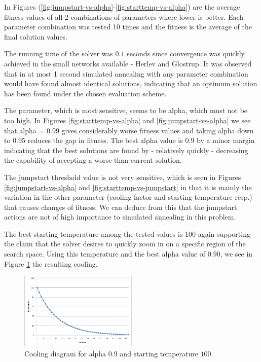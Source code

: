 In Figures (\ref{fig:jumpstart-vs-alpha}-\ref{fig:starttemp-vs-alpha}) are the average fitness values of all 2-combinations of parameters where lower is better. Each parameter combination was tested 10 times and the fitness is the average of the final solution values. 

The running time of the solver was $0.1$ seconds since convergence was quickly achieved in the small networks available - Herlev and Glostrup. It was observed that in at most 1 second simulated annealing with any parameter combination would have found almost identical solutions, indicating that an optimum solution has been found under the chosen evaluation scheme.

The parameter, which is most sensitive, seems to be alpha, which must not be too high. In Figures \ref{fig:starttemp-vs-alpha} and \ref{fig:jumpstart-vs-alpha} we see that alpha = $0.99$ gives considerably worse fitness values and taking alpha down to $0.95$ reduces the gap in fitness. The best alpha value is $0.9$ by a minor margin indicating that the best solutions are found by - relatively quickly - decreasing the capability of accepting a worse-than-current solution.

The jumpstart threshold value is not very sensitive, which is seen in Figures \ref{fig:jumpstart-vs-alpha} and \ref{fig:starttemp-vs-jumpstart} in that it is mainly the variation in the other parameter (cooling factor and starting temperature resp.) that causes changes of fitness. We can deduce from this that the jumpstart actions are not of high importance to simulated annealing in this problem.

The best starting temperature among the tested values is 100 again supporting the claim that the solver desires to quickly zoom in on a specific region of the search space. Using this temperature and the best alpha value of $0.90$, we see in Figure \ref{fig:cooling_scheme} the resulting cooling.

\begin{figure}[htbp]
\centering
\includegraphics[width=0.5\textwidth]{temp-vs-iter_alpha09_starttemp100.png}
\caption{Cooling diagram for alpha $0.9$ and starting temperature $100$.}
\label{fig:cooling_scheme}
\end{figure}

